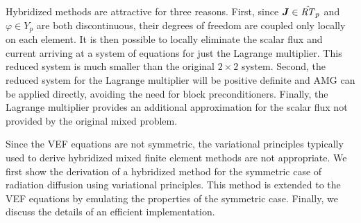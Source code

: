 \documentclass[../doc.tex]{subfiles}
\begin{document}
Hybridized methods are attractive for three reasons. First, since $\boldsymbol{J}\in\hat{\mathit{RT}}_p$ and $\varphi \in Y_p$ are both discontinuous, their degrees of freedom are coupled only locally on each element. It is then possible to locally eliminate the scalar flux and current arriving at a system of equations for just the Lagrange multiplier. This reduced system is much smaller than the original $2\times 2$ system. Second, the reduced system for the Lagrange multiplier will be positive definite and AMG can be applied directly, avoiding the need for block preconditioners. Finally, the Lagrange multiplier provides an additional approximation for the scalar flux not provided by the original mixed problem. 

Since the VEF equations are not symmetric, the variational principles typically used to derive hybridized mixed finite element methods are not appropriate. We first show the derivation of a hybridized method for the symmetric case of radiation diffusion using variational principles. This method is extended to the VEF equations by emulating the properties of the symmetric case. Finally, we discuss the details of an efficient implementation. 
\end{document}
